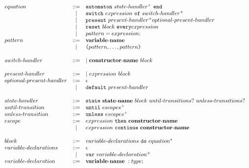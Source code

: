 \documentclass[a4paper]{article}
\newcommand{\Coloneqq}[0]{::=}
\begin{document}
\[
\begin{array}{lcl}
  equation & \Coloneqq &
    \mathtt{automaton} \ state\sdash{}handler^+ \ \mathtt{end} \\
  & | & \mathtt{switch} \ expression \ \mathtt{of} \ switch\sdash{}handler^+ \\
  & | & \mathtt{present} \ present\sdash{}handler^+
    optional\sdash{}present\sdash{}handler \\
  & | & \mathtt{reset} \ block \ \mathtt{every} expression \\
  & | & pattern = expression; \\
  pattern & \Coloneqq & {\bf variable\sdash{}name} \\
  & | & \lp{}pattern,\dots,pattern\rp{} \\

  \\

  switch\sdash{}handler &
    \Coloneqq & | \ {\bf constructor\sdash{}name} \ block \\

  \\

  present\sdash{}handler & \Coloneqq &
    | \ expression \  block \\
  optional\sdash{}present\sdash{}handler & \Coloneqq & \epsilon \\
  & | & \mathtt{default} \ present\sdash{}handler \\

  \\
  state\sdash{}handler & \Coloneqq &
    \mathtt{state} \  {\bf state\sdash{}name} \ block
    \ until\sdash{}transitions? \  unless\sdash{}transitions? \\
  until\sdash{}transition & \Coloneqq & \mathtt{until} \ escapes^+ \\
  unless\sdash{}transition & \Coloneqq & \mathtt{unless} \ escapes^+ \\
  escape & \Coloneqq &
    expression \ \mathtt{then} \ {\bf constructor\sdash{}name} \\
    & | & expression \ \mathtt{continue} \ {\bf constructor\sdash{}name} \\

  \\

  block & \Coloneqq & variable\sdash{}declarations \ \mathtt{do} \ equation^* \\
  variable\sdash{}declarations & \Coloneqq & \epsilon \\
  & | & \mathtt{var} \ variable\sdash{}declaration^+ \\
  variable\sdash{}declaration & \Coloneqq & {\bf variable\sdash{}name} \ : type;
    \\


\end{array}\]
\end{document}
